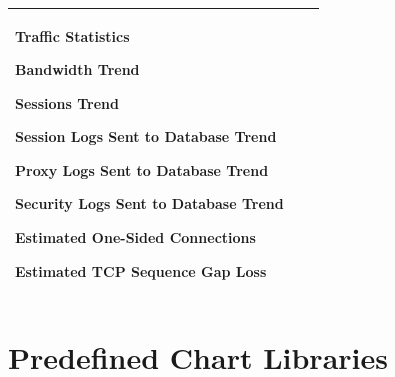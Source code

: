 \begin{longtable}{p{}|p{}|p{}}
                                                                                        Traffic Statistics


                                                                                        Bandwidth Trend


                                                                                        Sessions Trend 


                                                                                        Session Logs Sent to Database Trend


                                                                                        Proxy Logs Sent to Database Trend


                                                                                        Security Logs Sent to Database Trend


                                                                                        Estimated One-Sided Connections


                                                                                        Estimated TCP Sequence Gap Loss \\\hline

\end{longtable}

\section*{\hypertarget{link:Predefined Chart Libraries}{Predefined Chart Libraries}}
\label{sec:appendix_d:chart}

